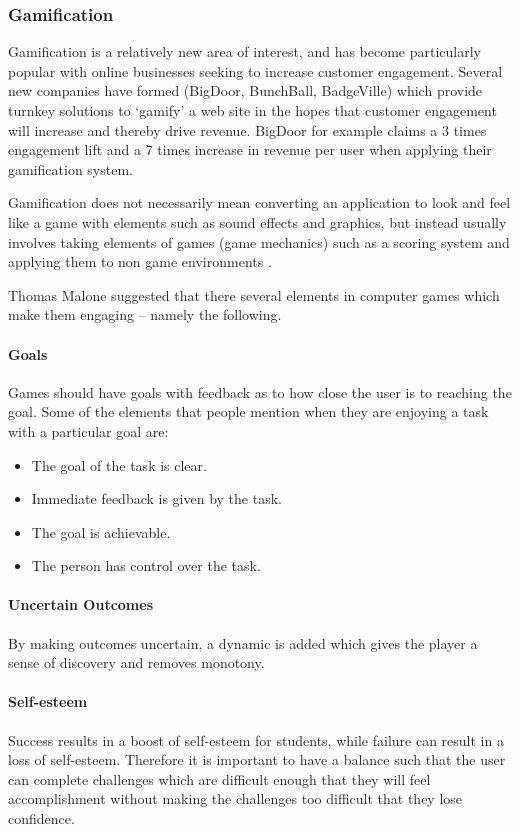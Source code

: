 \subsubsection{Gamification} \label{background_gamemechanics}
Gamification is a relatively new area of interest, and has become particularly
popular with online businesses seeking to increase customer engagement\cite{_farmville_2010}. Several
new companies have formed (BigDoor, BunchBall, BadgeVille) which provide turnkey
solutions to `gamify' a web site in the hopes that customer engagement will 
increase and thereby drive revenue. BigDoor for example claims a 3 times 
engagement lift and a 7 times increase
in revenue per user when applying their gamification system\cite{_bigdoor_????}.

Gamification does not necessarily mean converting an application to look and feel like a game with elements such as sound effects and graphics, but instead usually involves
taking elements of games (game mechanics) such as a scoring system and applying them to
non game environments \cite{carr_gamification:_2011}.

Thomas Malone suggested that there several elements \cite{malone_what_1980} in computer games which make them engaging -- namely the following.
\paragraph{Goals}
Games should have goals with feedback as to how close the user is to reaching
the goal.
Some of the elements that people mention\cite{csikszentmihalyi_flow:_1991} when they are enjoying a task with a particular goal are:
\begin{itemize}
	\item The goal of the task is clear.
	\item Immediate feedback is given by the task.
	\item The goal is achievable.
	\item The person has control over the task.
\end{itemize}

\paragraph{Uncertain Outcomes}
By making outcomes uncertain, a dynamic is added which gives the player a sense
of discovery and removes monotony.
\paragraph{Self-esteem}
Success results in a boost of self-esteem for students, while failure can
result in a loss of self-esteem. Therefore it is important to have a balance
such that the user can complete challenges which are difficult enough that they
will feel accomplishment without making the challenges too difficult that they
lose confidence.
